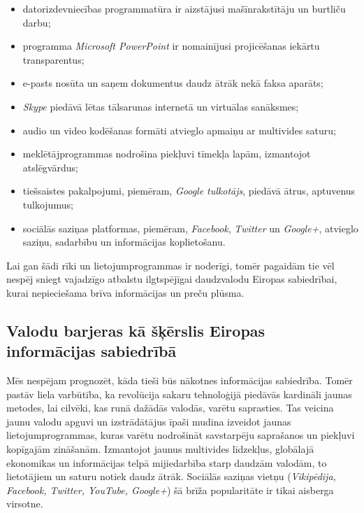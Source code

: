 \begin{multicols}{2}
\begin{itemize}
\item  datorizdevniecības programmatūra ir aizstājusi mašīnrakstītāju un burtliču darbu;
\item  programma \textit{Microsoft PowerPoint} ir nomainījusi projicēšanas iekārtu transparentus;
\item  e-pasts nosūta un saņem dokumentus daudz ātrāk nekā faksa aparāts;
\item  \textit{Skype} piedāvā lētas tālsarunas internetā un virtuālas sanāksmes;
\item  audio un video kodēšanas formāti atvieglo apmaiņu ar multivides saturu;
\item  meklētājprogrammas nodrošina piekļuvi tīmekļa lapām, izmantojot atslēgvārdus;
\item  tiešsaistes pakalpojumi, piemēram, \textit{Google tulkotājs}, piedāvā ātrus, aptuvenus tulkojumus;
\item  sociālās saziņas platformas, piemēram, \textit{Facebook}, \textit{Twitter} un \textit{Google+}, atvieglo saziņu, sadarbību un informācijas koplietošanu.
\end{itemize}

Lai gan šādi rīki un lietojumprogrammas ir noderīgi, tomēr pagaidām tie vēl nespēj sniegt vajadzīgo atbalstu ilgtspējīgai daudzvalodu Eiropas sabiedrībai, kurai nepieciešama brīva informācijas un preču plūsma.

\subsection{Valodu barjeras kā šķērslis Eiropas informācijas sabiedrībā}

Mēs nespējam prognozēt, kāda tieši būs nākotnes informācijas sabiedrība. 
Tomēr pastāv liela varbūtība, ka revolūcija sakaru tehnoloģijā piedāvās kardināli jaunas metodes, lai cilvēki, kas runā dažādās valodās, varētu saprasties. 
Tas veicina jaunu valodu apguvi un izstrādātājus īpaši mudina izveidot jaunas lietojumprogrammas, kuras varētu nodrošināt savstarpēju saprašanos un piekļuvi kopīgajām zināšanām. 
Izmantojot jaunus multivides līdzekļus, globālajā ekonomikas un informācijas telpā mijiedarbība starp daudzām valodām, to lietotājiem un saturu notiek daudz ātrāk. 
Sociālās saziņas vietņu (\textit{Vikipēdija, Facebook, Twitter, YouTube, Google+}) šā brīža popularitāte ir tikai aisberga virsotne.



\end{multicols}
